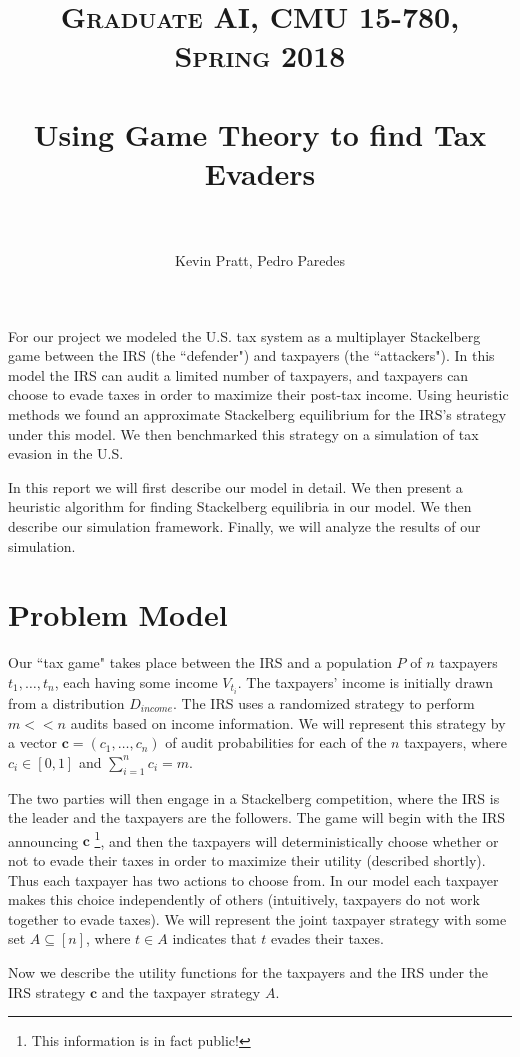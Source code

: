 \documentclass[paper=letter, fontsize=11pt]{article}
\title{
  \normalfont \normalsize
  \textsc{Graduate AI, CMU 15-780, Spring 2018} \\ [25pt]
  \horrule{0.5pt} \\[0.4cm]
  \huge Using Game Theory to find Tax Evaders \\
  \horrule{2pt} \\[0.5cm]
}
\author{Kevin Pratt, Pedro Paredes}
\date{}
\begin{document}
\maketitle
\thispagestyle{firstpage}

For our project we modeled the U.S. tax system as a multiplayer Stackelberg game between the IRS (the ``defender") and taxpayers (the ``attackers"). In this model the IRS can audit a limited number of taxpayers, and taxpayers can choose to evade taxes in order to maximize their post-tax income. Using heuristic methods we found an approximate Stackelberg equilibrium for the IRS's strategy under this model. We then benchmarked this strategy on a simulation of tax evasion in the U.S.

In this report we will first describe our model in detail. We then present a heuristic algorithm for finding Stackelberg equilibria in our model. We then describe our simulation framework. Finally, we will analyze the results of our simulation.

\section*{Problem Model}

Our ``tax game" takes place between the IRS and a population $P$ of $n$ taxpayers $t_1, \ldots, t_n$, each having some income $V_{t_i}$. The taxpayers' income is initially drawn from a distribution $D_{income}$. The IRS uses a randomized strategy to perform $m << n$ audits based on income information. We will represent this strategy by a vector $\bm{c} = (c_1, \ldots, c_n)$ of audit probabilities for each of the $n$ taxpayers, where $c_i \in [0,1]$ and $\sum_{i = 1}^n c_i = m$.

The two parties will then engage in a Stackelberg competition, where the IRS is the leader and the taxpayers are the followers. The game will begin with the IRS announcing $\bm{c}$ \footnote{This information is in fact public!}, and then the taxpayers will deterministically choose whether or not to evade their taxes in order to maximize their utility (described shortly). Thus each taxpayer has two actions to choose from. In our model each taxpayer makes this choice independently of others (intuitively, taxpayers do not work together to evade taxes). We will represent the joint taxpayer strategy with some set $A \subseteq [n]$, where $t \in A$ indicates that $t$ evades their taxes.

Now we describe the utility functions for the taxpayers and the IRS under the IRS strategy $\bm{c}$ and the taxpayer strategy $A$.
\end{document}
